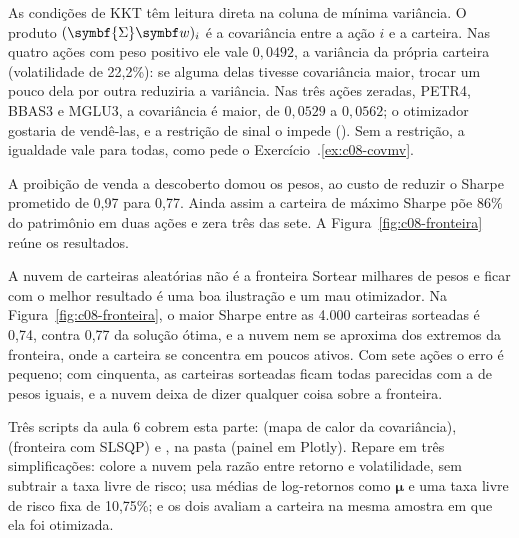 As condições de KKT têm leitura direta na coluna de mínima variância. O produto $(\symbf{\Sigma}\vetor{w})_i$ é a covariância entre a ação $i$ e a carteira. Nas quatro ações com peso positivo ele vale $0,0492$, a variância da própria carteira (volatilidade de 22,2\%): se alguma delas tivesse covariância maior, trocar um pouco dela por outra reduziria a variância. Nas três ações zeradas, PETR4, BBAS3 e MGLU3, a covariância é maior, de $0,0529$ a $0,0562$; o otimizador gostaria de vendê-las, e a restrição de sinal o impede (). Sem a restrição, a igualdade vale para todas, como pede o Exercício~\thechapter.\ref{ex:c08-covmv}.

A proibição de venda a descoberto domou os pesos, ao custo de reduzir o Sharpe prometido de 0,97 para 0,77. Ainda assim a carteira de máximo Sharpe põe 86\% do patrimônio em duas ações e zera três das sete. A Figura~\ref{fig:c08-fronteira} reúne os resultados.


\begin{armadilha}{A nuvem de carteiras aleatórias não é a fronteira}
Sortear milhares de pesos e ficar com o melhor resultado é uma boa ilustração e um mau otimizador. Na Figura~\ref{fig:c08-fronteira}, o maior Sharpe entre as 4.000 carteiras sorteadas é 0,74, contra 0,77 da solução ótima, e a nuvem nem se aproxima dos extremos da fronteira, onde a carteira se concentra em poucos ativos. Com sete ações o erro é pequeno; com cinquenta, as carteiras sorteadas ficam todas parecidas com a de pesos iguais, e a nuvem deixa de dizer qualquer coisa sobre a fronteira.
\end{armadilha}

\begin{repositorio}
Três scripts da aula 6 cobrem esta parte:  (mapa de calor da covariância),  (fronteira com SLSQP) e , na pasta  (painel em Plotly). Repare em três simplificações:  colore a nuvem pela razão entre retorno e volatilidade, sem subtrair a taxa livre de risco;  usa médias de log-retornos como $\symbf{\mu}$ e uma taxa livre de risco fixa de 10,75\%; e os dois avaliam a carteira na mesma amostra em que ela foi otimizada.
\end{repositorio}

